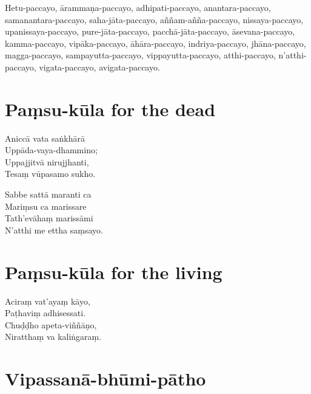 \begin{paritta}
Hetu-paccayo, ārammaṇa-paccayo, adhipati-paccayo, anantara-paccayo,
samanantara-paccayo, saha-jāta-paccayo, aññam-añña-paccayo,
nissaya-paccayo, upanissaya-paccayo, pure-jāta-paccayo,
pacchā-jāta-paccayo, āsevana-paccayo, kamma-paccayo, vipāka-paccayo,
āhāra-paccayo, indriya-paccayo, jhāna-paccayo, magga-paccayo,
sampayutta-paccayo, vippayutta-paccayo, atthi-paccayo, n'atthi-paccayo,
vigata-paccayo, avigata-paccayo.
\end{paritta}

\chapter{Paṃsu-kūla for the dead}%


\begin{paritta}
Aniccā vata saṅkhārā\\
Uppāda-vaya-dhammino;\\
Uppajjitvā nirujjhanti,\\
Tesaṃ vūpasamo sukho.

Sabbe sattā maranti ca\\
Mariṃsu ca marissare\\
Tath'evāhaṃ marissāmi\\
N'atthi me ettha saṃsayo.

\end{paritta}

\chapter{Paṃsu-kūla for the living}%


\begin{paritta}
Aciraṃ vat'ayaṃ kāyo,\\
Paṭhaviṃ adhisessati.\\
Chuḍḍho apeta-viññāṇo,\\
Niratthaṃ va kaliṅgaraṃ.

\end{paritta}

\clearpage

\chapter{Vipassanā-bhūmi-pātho}%

